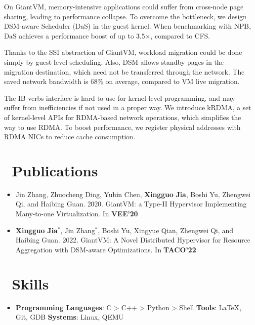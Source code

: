 \documentclass{resume}
\begin{document}
On GiantVM, memory-intensive applications could suffer from cross-node page sharing, leading to performance collapse. To overcome the bottleneck, we design DSM-aware Scheduler (DaS) in the guest kernel. When benchmarking with NPB, DaS achieves a performance boost of up to 3.5$\times$, compared to CFS. 


Thanks to the SSI abstraction of GiantVM, workload migration could be done simply by guest-level
scheduling. Also, DSM allows standby pages in the migration destination, which need not be transferred through
the network. The saved network bandwidth is 68\% on average, compared to VM live migration.

The IB verbs interface is hard to use for kernel-level programming, and may suffer from inefficiencies if not used in a proper way. We introduce kRDMA, a set of kernel-level APIs for RDMA-based network operations, which simplifies the way to use RDMA. To boost performance, we register physical addresses with RDMA NICs to reduce cache consumption.

\section{\faGraduationCap\ Publications}
\begin{itemize}
\item Jin Zhang, Zhuocheng Ding, Yubin Chen, \textbf{Xingguo Jia}, Boshi Yu, Zhengwei Qi, and Haibing Guan. 2020. GiantVM: a Type-II Hypervisor Implementing Many-to-one Virtualization. In \textbf{VEE'20}
\item \textbf{Xingguo Jia$^*$}, Jin Zhang$^*$, Boshi Yu, Xingyue Qian, Zhengwei Qi, and Haibing Guan. 2022. GiantVM: A Novel Distributed Hypervisor for Resource Aggregation with DSM-aware Optimizations. In \textbf{TACO'22}
\end{itemize}

\section{\faCogs\ Skills}
\begin{itemize}[parsep=0.5ex]
  \item \textbf{Programming Languages}: C > C++ > Python > Shell \textbf{Tools}: \LaTeX, Git, GDB \textbf{Systems}: Linux, QEMU
\end{itemize}
\end{document}
